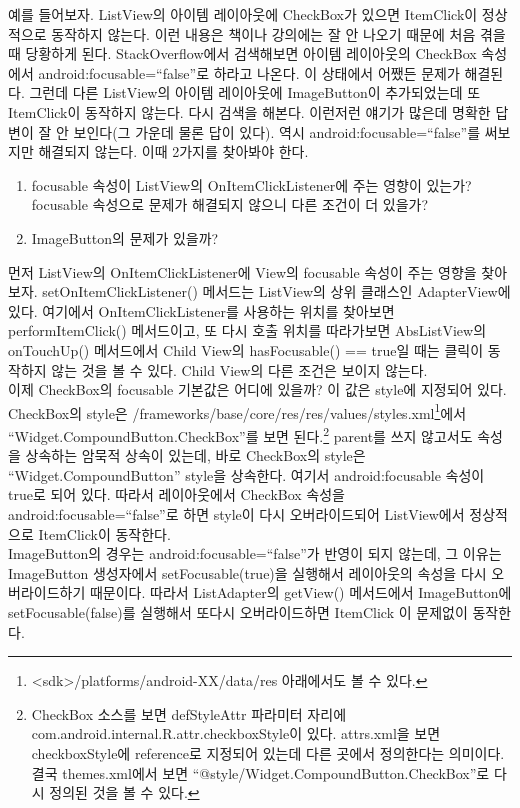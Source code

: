 예를 들어보자.
ListView의 아이템 레이아웃에 CheckBox가 있으면 ItemClick이 정상적으로 동작하지 않는다. 이런 내용은 책이나 강의에는 잘 안 나오기 때문에 처음 겪을 때 당황하게 된다. 
StackOverflow에서 검색해보면 아이템 레이아웃의 CheckBox 속성에서 android:focusable=``false''로 하라고 나온다. 이 상태에서 어쨌든 문제가 해결된다.
그런데 다른 ListView의 아이템 레이아웃에 ImageButton이 추가되었는데 또 ItemClick이 동작하지 않는다. 다시 검색을 해본다. 이런저런 얘기가 많은데 명확한 답변이 잘 안 보인다(그 가운데 물론 답이 있다). 역시 android:focusable=``false''를 써보지만 해결되지 않는다. 이때 2가지를 찾아봐야 한다. 
\begin{enumerate}
\item focusable 속성이 ListView의 OnItemClickListener에 주는 영향이 있는가? focusable 속성으로 문제가 해결되지 않으니 다른 조건이 더 있을가?
\item ImageButton의 문제가 있을까?
\end{enumerate}

먼저 ListView의 OnItemClickListener에 View의 focusable 속성이 주는 영향을 찾아보자. setOnItemClickListener() 메서드는 ListView의 상위 클래스인 AdapterView에 있다. 
여기에서 OnItemClickListener를 사용하는 위치를 찾아보면 performItemClick() 메서드이고, 또 다시 호출 위치를 따라가보면 AbsListView의 onTouchUp() 메서드에서 Child View의 hasFocusable() == true일 때는 클릭이 동작하지 않는 것을 볼 수 있다. Child View의 다른 조건은 보이지 않는다.\\

이제 CheckBox의 focusable 기본값은 어디에 있을까? 이 값은 style에 지정되어 있다.
CheckBox의 style은 /frameworks/base/core/res/res/values/styles.xml\footnote{<sdk>/platforms/android-XX/data/res 아래에서도 볼 수 있다.}에서 ``Widget.CompoundButton.CheckBox''를 보면 된다.\footnote{CheckBox 소스를 보면 defStyleAttr 파라미터 자리에 com.android.internal.R.attr.checkboxStyle이 있다. attrs.xml을 보면 checkboxStyle에 reference로 지정되어 있는데 다른 곳에서 정의한다는 의미이다. 결국 themes.xml에서 보면 ``@style/Widget.CompoundButton.CheckBox''로 다시 정의된 것을 볼 수 있다.}
parent를 쓰지 않고서도 속성을 상속하는 암묵적 상속이 있는데, 바로 CheckBox의 style은 ``Widget.CompoundButton'' style을 상속한다. 여기서 android:focusable 속성이 true로 되어 있다.
따라서 레이아웃에서 CheckBox 속성을 android:focusable=``false''로 하면 style이 다시 오버라이드되어 ListView에서 정상적으로 ItemClick이 동작한다.\\

ImageButton의 경우는 android:focusable=``false''가 반영이 되지 않는데, 그 이유는 ImageButton 생성자에서 setFocusable(true)을 실행해서 레이아웃의 속성을 다시 오버라이드하기 때문이다. 따라서 ListAdapter의 getView() 메서드에서 ImageButton에 setFocusable(false)를 실행해서 또다시 오버라이드하면 ItemClick 이 문제없이 동작한다.\\


